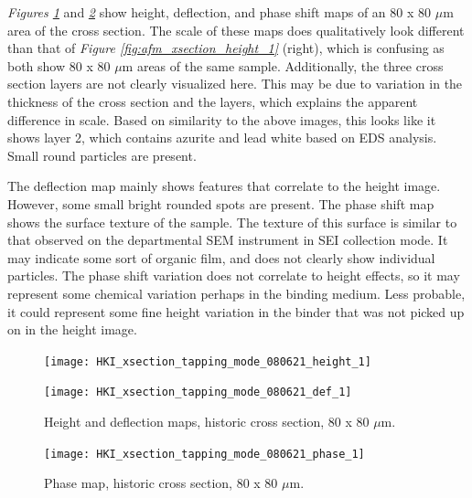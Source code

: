\textit{Figures \ref{fig:afm_xsection_height_def_1}} and \textit{\ref{fig:afm_xsection_phase_1}} show height, deflection, and phase shift maps of an 80 x 80 $\mu$m area of the cross section. The scale of these maps does qualitatively look different than that of \textit{Figure \ref{fig:afm_xsection_height_1}} (right), which is confusing as both show 80 x 80 $\mu$m areas of the same sample. Additionally, the three cross section layers are not clearly visualized here. This may be due to variation in the thickness of the cross section and the layers, which explains the apparent difference in scale. Based on similarity to the above images, this looks like it shows layer 2, which contains azurite and lead white based on EDS analysis. Small round particles are present.

The deflection map mainly shows features that correlate to the height image. However, some small bright rounded spots are present. The phase shift map shows the surface texture of the sample. The texture of this surface is similar to that observed on the departmental SEM instrument in SEI collection mode. It may indicate some sort of organic film, and does not clearly show individual particles. The phase shift variation does not correlate to height effects, so it may represent some chemical variation perhaps in the binding medium. Less probable, it could represent some fine height variation in the binder that was not picked up on in the height image.

\begin{figure}[H]
\centering
\begin{minipage}{.45\textwidth}
  \centering
  \texttt{[image: HKI\_xsection\_tapping\_mode\_080621\_height\_1]}
\end{minipage}
\begin{minipage}{.45\textwidth}
  \centering
  \texttt{[image: HKI\_xsection\_tapping\_mode\_080621\_def\_1]}
\end{minipage}
\caption[Height and deflection maps, historic cross section]{Height and deflection maps, historic cross section, 80 x 80 $\mu$m.}
\label{fig:afm_xsection_height_def_1}
\end{figure}

\begin{figure}[H]
\centering
  \texttt{[image: HKI\_xsection\_tapping\_mode\_080621\_phase\_1]}
\caption[Phase map, historic cross section]{Phase map, historic cross section, 80 x 80 $\mu$m.}
\label{fig:afm_xsection_phase_1}
\end{figure}


